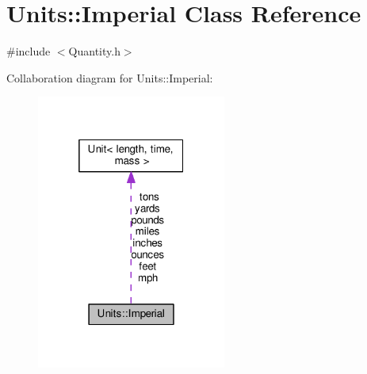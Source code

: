 \hypertarget{class_units_1_1_imperial}{\section{Units\+:\+:Imperial Class Reference}
\label{class_units_1_1_imperial}
}


{\ttfamily \#include $<$Quantity.\+h$>$}



Collaboration diagram for Units\+:\+:Imperial\+:\nopagebreak
\begin{figure}[H]
\begin{center}
\leavevmode
\includegraphics[width=176pt]{class_units_1_1_imperial__coll__graph}
\end{center}
\end{figure}
